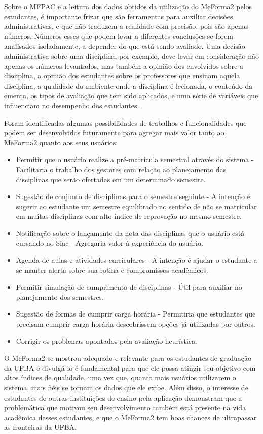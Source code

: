 Sobre o MFPAC e a leitura dos dados obtidos da utilização do MeForma2 pelos estudantes, é importante frizar que são ferramentas para auxiliar decisões administrativas, e que não traduzem a realidade com precisão, pois são apenas números. Números esses que podem levar a diferentes conclusões se forem analisados isoladamente, a depender do que está sendo avaliado. Uma decisão administrativa sobre uma disciplina, por exemplo, deve levar em consideração não apenas os números levantados, mas também a opinião dos envolvidos sobre a disciplina, a opinião dos estudantes sobre os professores que ensinam aquela disciplina, a qualidade do ambiente onde a disciplina é lecionada, o conteúdo da ementa, os tipos de avaliação que tem sido aplicados, e uma série de variáveis que influenciam no desempenho dos estudantes. 

Foram identificadas algumas possibilidades de trabalhos e funcionalidades que podem ser desenvolvidos futuramente para agregar mais valor tanto ao MeForma2 quanto aos seus usuários:

\begin{itemize}
    \item Permitir que o usuário realize a pré-matrícula semestral através do sistema - Facilitaria o trabalho dos gestores com relação ao planejamento das disciplinas que serão ofertadas em um determinado semestre.
    \item Sugestão de conjunto de disciplinas para o semestre seguinte - A intenção é sugerir ao estudante um semestre equilibrado no sentido de não se matricular em muitas disciplinas com alto índice de reprovação no mesmo semestre.
    \item Notificação sobre o lançamento da nota das disciplinas que o usuário está cursando no Siac - Agregaria valor à experiência do usuário.
    \item Agenda de aulas e atividades curriculares - A intenção é ajudar o estudante a se manter alerta sobre sua rotina e compromissos acadêmicos.
    \item Permitir simulação de cumprimento de disciplinas - Útil para auxiliar no planejamento dos semestres.
    \item Sugestão de formas de cumprir carga horária - Permitiria que estudantes que precisam cumprir carga horária descobrissem opções já utilizadas por outros.
    \item Corrigir os problemas apontados pela avaliação heurística.
\end{itemize}

O MeForma2 se mostrou adequado e relevante para os estudantes de graduação da UFBA e divulgá-lo é fundamental para que ele possa atingir seu objetivo com altos índices de qualidade, uma vez que, quanto mais usuários utilizarem o sistema, mais fiéis se tornam os dados que ele exibe. Além disso, o interesse de estudantes de outras instituições de ensino pela aplicação demonstram que a problemática que motivou seu desenvolvimento também está presente na vida acadêmica desses estudantes, e que o MeForma2 tem boas chances de ultrapassar as fronteiras da UFBA.